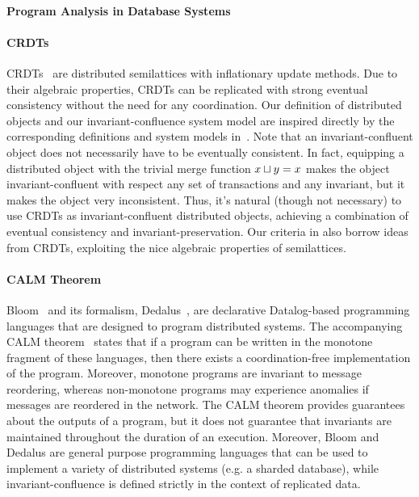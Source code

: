 \paragraph{Program Analysis in Database Systems}

\paragraph{CRDTs}
CRDTs~\cite{shapiro2011conflict, shapiro2011comprehensive} are distributed
semilattices with inflationary update methods. Due to their algebraic
properties, CRDTs can be replicated with strong eventual consistency without
the need for any coordination. Our definition of distributed objects and our
invariant-confluence system model are inspired directly by the corresponding
definitions and system models in~\cite{shapiro2011conflict}. Note that an
invariant-confluent object does not necessarily have to be eventually
consistent. In fact, equipping a distributed object with the trivial merge
function $x \sqcup y = x$ makes the object invariant-confluent with respect
any set of transactions and any invariant, but it makes the object very
inconsistent. Thus, it's natural (though not necessary) to use CRDTs as
invariant-confluent distributed objects, achieving a combination of eventual
consistency and invariant-preservation. Our criteria in
 also borrow ideas from CRDTs, exploiting the nice
algebraic properties of semilattices.

\paragraph{CALM Theorem}
Bloom~\cite{alvaro2010boom, alvaro2011consistency, conway2012logic} and its
formalism, Dedalus~\cite{alvaro2011dedalus, alvaro2013declarative}, are
declarative Datalog-based programming languages that are designed to program
distributed systems. The accompanying CALM
theorem~\cite{hellerstein2010declarative, ameloot2013relational} states that if
a program can be written in the monotone fragment of these languages, then
there exists a coordination-free implementation of the program. Moreover,
monotone programs are invariant to message reordering, whereas non-monotone
programs may experience anomalies if messages are reordered in the network. The
CALM theorem provides guarantees about the outputs of a program, but it does
not guarantee that invariants are maintained throughout the duration of an
execution. Moreover, Bloom and Dedalus are general purpose programming
languages that can be used to implement a variety of distributed systems (e.g.
a sharded database), while invariant-confluence is defined strictly in the
context of replicated data.

